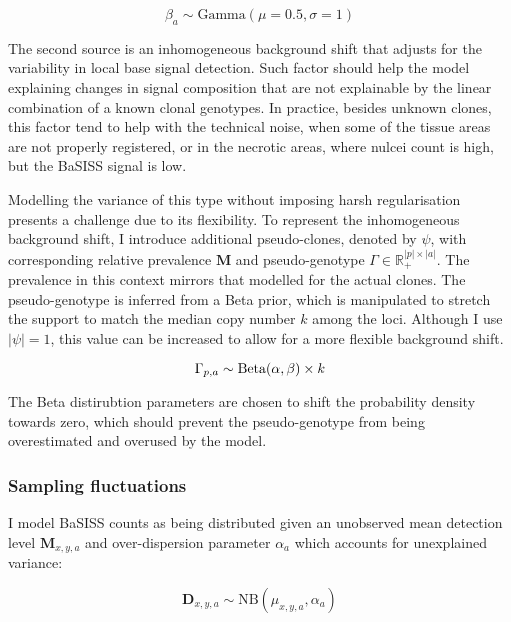 \begin{equation} 
\beta_{a} \sim \text{Gamma}(\mu=0.5, \sigma=1) 
\end{equation}

The second source is an inhomogeneous background shift that adjusts for the variability in local base signal detection. Such factor should help the model explaining changes in signal composition that are not explainable by the linear combination of a known clonal genotypes. In practice, besides unknown clones, this factor tend to help with the technical noise, when some of the tissue areas are not properly registered, or in the necrotic areas, where nulcei count is high, but the \ac{BaSISS} signal is low.

Modelling the variance of this type without imposing harsh regularisation presents a challenge due to its flexibility. To represent the inhomogeneous background shift, I introduce additional pseudo-clones, denoted by $\psi$, with corresponding relative prevalence $\mathbf{M}$ and pseudo-genotype $\Gamma \in \mathbb{R}^{|p|\times|a|}_{+}$. The prevalence in this context mirrors that modelled for the actual clones. The pseudo-genotype is inferred from a Beta prior, which is manipulated to stretch the support to match the median copy number $k$ among the loci. Although I use $|\psi| = 1$, this value can be increased to allow for a more flexible background shift.

\begin{equation} 
    {\Gamma}_{p,a} \sim \text{Beta}(\alpha, \beta) \times k \\
\end{equation}

The Beta distirubtion parameters are chosen to shift the probability density towards zero, which should prevent the pseudo-genotype from being overestimated and overused by the model.

\subsubsection*{Sampling fluctuations}

I model BaSISS counts as being  distributed given an unobserved mean detection level $\mathbf{M}_{x,y,a}$ and over-dispersion parameter ${\alpha}_a$ which accounts for unexplained variance:

\begin{equation} 
\mathbf{D}_{x,y,a} \sim \text{NB}(\mu_{x,y,a}, \alpha_a)
\end{equation}


